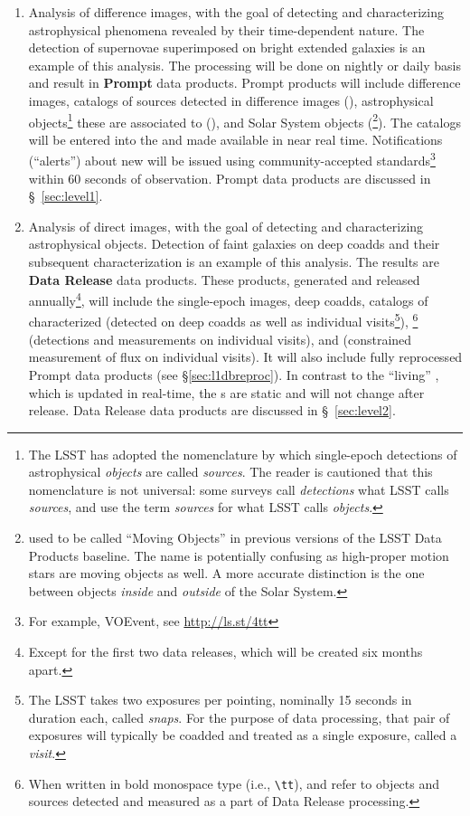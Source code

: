 \documentclass[SE,lsstdraft,toc]{lsstdoc}
\begin{document}
\begin{enumerate}
\item Analysis of difference images, with the goal of detecting and characterizing astrophysical phenomena revealed by their time-dependent nature. The detection of supernovae superimposed on bright extended galaxies is an example of this analysis. The processing will be done on nightly or daily basis and result in \textbf{Prompt} data products. Prompt products will include difference images, catalogs of sources detected in difference images (\DIASources), astrophysical objects\footnote{The LSST has adopted the nomenclature by which single-epoch detections of astrophysical \emph{objects} are called \emph{sources}. The reader is cautioned that this nomenclature is not universal: some surveys call \emph{detections} what LSST calls \emph{sources}, and use the term \emph{sources} for what LSST calls \emph{objects}.} these are associated to (\DIAObjects), and Solar System objects (\SSObjects\footnote{\SSObjects used to be called ``Moving Objects'' in previous versions of the LSST Data Products baseline. The name is potentially confusing as high-proper motion stars are moving objects as well. A more accurate distinction is the one between objects \emph{inside} and \emph{outside} of the Solar System.}). The catalogs will be entered into the \textbf{\DB} and made available in near real time. Notifications (``alerts'') about new \DIASources will be issued using community-accepted
standards\footnote{For example, VOEvent, see \url{http://ls.st/4tt}} within 60 seconds of observation. Prompt data products are discussed in \S~\ref{sec:level1}.

\item Analysis of direct images, with the goal of detecting and characterizing astrophysical objects. Detection of faint galaxies on deep coadds and their subsequent characterization is an example of this analysis. The results are \textbf{Data Release} data products. These products, generated and released annually\footnote{Except for the first two data releases, which will be created six months apart.}, will include the single-epoch images, deep coadds, catalogs of characterized \Objects (detected on deep coadds as well as individual visits\footnote{The LSST takes two exposures per pointing, nominally 15 seconds in duration each, called \emph{snaps}. For the purpose of data processing, that pair of exposures will typically be coadded and treated as a single exposure, called a \emph{visit}.}), \Sources\footnote{When written in bold monospace type (i.e., \texttt{\textbackslash{}tt}), \Objects and \Sources refer to objects and sources detected and measured as a part of Data Release processing.} (detections and measurements on individual visits), and \ForcedSources (constrained measurement of flux on individual visits). It will also include fully reprocessed Prompt data products (see \S \ref{sec:l1dbreproc}). In contrast to the ``living'' \DB, which is updated in real-time, the \DR{}s are static and will not change after release. Data Release data products are discussed in \S~\ref{sec:level2}.
\end{enumerate}
\end{document}
